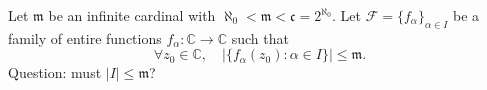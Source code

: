 Let \(\mathfrak{m}\) be an infinite cardinal with
\(\aleph_0<\mathfrak{m}<\mathfrak{c}=2^{\aleph_0}\).
Let \(\mathcal{F}=\{f_\alpha\}_{\alpha\in I}\) be a family of entire functions \(f_\alpha:\mathbb{C}\to\mathbb{C}\) such that
\[
\forall z_0\in\mathbb{C},\quad \bigl|\{f_\alpha(z_0):\alpha\in I\}\bigr|\le \mathfrak{m}.
\]
Question: must \(|I|\le \mathfrak{m}\)?
